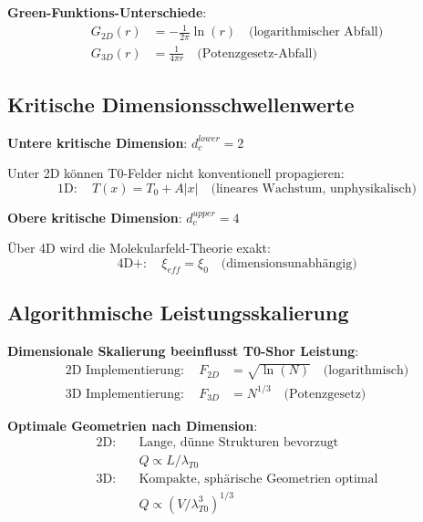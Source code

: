 \documentclass[12pt,a4paper]{article}
\newcommand{\xipar}{\xi}
\begin{document}
	\textbf{Green-Funktions-Unterschiede}:
	\begin{align}
		G_{2D}(r) &= -\frac{1}{2\pi} \ln(r) \quad \text{(logarithmischer Abfall)} \\
		G_{3D}(r) &= \frac{1}{4\pi r} \quad \text{(Potenzgesetz-Abfall)}
	\end{align}
	
	\subsection{Kritische Dimensionsschwellenwerte}
	
	\textbf{Untere kritische Dimension}: $d_c^{lower} = 2$
	
	Unter 2D können T0-Felder nicht konventionell propagieren:
	\begin{equation}
		\text{1D}: \quad T(x) = T_0 + A|x| \quad \text{(lineares Wachstum, unphysikalisch)}
	\end{equation}
	
	\textbf{Obere kritische Dimension}: $d_c^{upper} = 4$
	
	Über 4D wird die Molekularfeld-Theorie exakt:
	\begin{equation}
		\text{4D+}: \quad \xipar_{eff} = \xipar_0 \quad \text{(dimensionsunabhängig)}
	\end{equation}
	
	\subsection{Algorithmische Leistungsskalierung}
	
	\textbf{Dimensionale Skalierung beeinflusst T0-Shor Leistung}:
	\begin{align}
		\text{2D Implementierung}: \quad F_{2D} &= \sqrt{\ln(N)} \quad \text{(logarithmisch)} \\
		\text{3D Implementierung}: \quad F_{3D} &= N^{1/3} \quad \text{(Potenzgesetz)}
	\end{align}
	
	\textbf{Optimale Geometrien nach Dimension}:
	\begin{align}
		\text{2D}: \quad &\text{Lange, dünne Strukturen bevorzugt} \\
		&Q \propto L/\lambda_{T0} \\
		\text{3D}: \quad &\text{Kompakte, sphärische Geometrien optimal} \\
		&Q \propto (V/\lambda_{T0}^3)^{1/3}
	\end{align}
	
\end{document}

